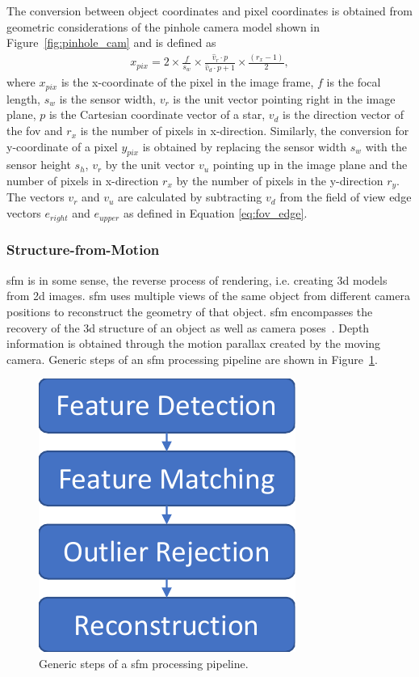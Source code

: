 The conversion between object coordinates and pixel coordinates is obtained from geometric considerations of the pinhole camera model shown in Figure~\ref{fig:pinhole_cam} and is defined as
\begin{align}
    x_{pix} = 2 \times \frac{f}{s_w} \times \frac{\hat{v}_r \cdot p}{\hat{v}_d \cdot p + 1} \times \frac{(r_x - 1)}{2}, \label{eq:pix_conversion} 
\end{align}
where $x_{pix}$ is the x-coordinate of the pixel in the image frame, $f$ is the focal length, $s_w$ is the sensor width, $v_r$ is the unit vector pointing right in the image plane, $p$ is the Cartesian coordinate vector of a star, $v_d$ is the direction vector of the \gls{fov} and $r_x$ is the number of pixels in x-direction. Similarly, the conversion for y-coordinate of a pixel $y_{pix}$ is obtained by replacing the sensor width $s_w$ with the sensor height $s_h$, $v_r$ by the unit vector $v_u$ pointing up in the image plane and the number of pixels in x-direction $r_x$ by the number of pixels in the y-direction $r_y$. The vectors $v_r$ and $v_u$ are calculated by subtracting $v_d$ from the field of view edge vectors $e_{right}$ and $e_{upper}$ as defined in Equation \ref{eq:fov_edge}.

\subsubsection{Structure-from-Motion}
\Gls{sfm} is in some sense, the reverse process of rendering, i.e. creating \gls{3d} models from \gls{2d} images. \gls{sfm} uses multiple views of the same object from different camera positions to reconstruct the geometry of that object. \Gls{sfm} encompasses the recovery of the \gls{3d} structure of an object as well as camera poses~\cite{szeliski2010computer}. Depth information is obtained through the motion parallax created by the moving camera. Generic steps of an \gls{sfm} processing pipeline are shown in Figure~\ref{fig:sfm_steps}.

\begin{figure}[htb]
    \centering
    \includegraphics[width=.25\textwidth]{doc/thesis/0_figures/sfm/SfM.pdf}
    \caption{Generic steps of a \gls{sfm} processing pipeline.}
    \label{fig:sfm_steps}
\end{figure}

